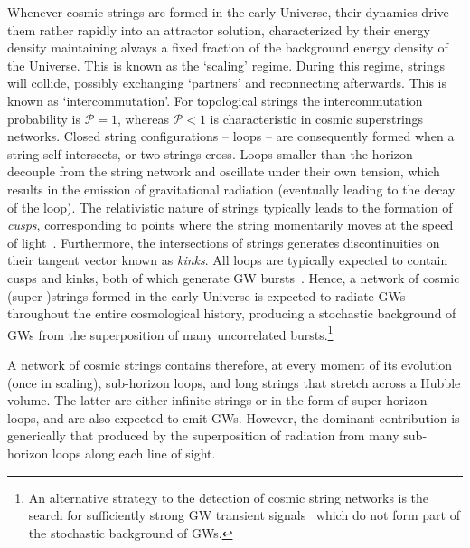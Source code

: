 \documentclass[11pt,a4paper]{article}
\begin{document}
Whenever cosmic strings are formed in the early Universe, their dynamics drive them rather rapidly into an attractor solution, characterized by their energy density maintaining always a fixed fraction of the background energy density of the Universe. This is known as the `scaling' regime. During this regime, strings will collide, possibly exchanging `partners' and reconnecting afterwards. This is known as `intercommutation'. For topological strings the intercommutation probability is $\mathcal{P}=1$, whereas $\mathcal{P}<1$ is characteristic in cosmic superstrings networks. Closed string configurations -- loops -- are consequently formed when a string self-intersects, or two strings cross. Loops smaller than the horizon decouple from the string network and oscillate under their own tension, which results in the emission of gravitational radiation (eventually leading to the decay of the loop). The relativistic nature of strings typically leads to the formation of {\it cusps}, corresponding to points where the string momentarily moves at the speed of light~\cite{Turok:1984cn}. Furthermore, the intersections of strings generates discontinuities on their tangent vector known as {\it kinks}. All loops are typically expected to contain cusps and kinks, both of which generate GW bursts~\cite{Damour:2000wa,Damour:2001bk}. Hence, a network of cosmic (super-)strings formed in the early Universe is expected to radiate GWs throughout the entire cosmological history, producing a stochastic background of GWs from the superposition of many uncorrelated bursts.\footnote{An alternative strategy to the detection of cosmic string networks is the search for sufficiently strong GW transient signals~\cite{Aasi:2013vna,Abbott:2017mem} which do not form part of the stochastic background of GWs.}

A network of cosmic strings contains therefore, at every moment of its evolution (once in scaling), sub-horizon loops, and long strings that stretch across a Hubble volume. The latter are either infinite strings or in the form of super-horizon loops, and are also expected to emit GWs. However, the dominant contribution is generically that produced by the superposition of radiation from many sub-horizon loops along each line of sight.
\end{document}
